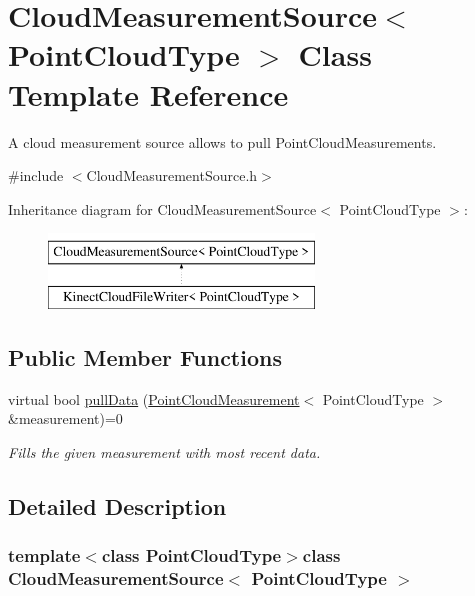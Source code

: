 \hypertarget{class_cloud_measurement_source}{}\section{Cloud\+Measurement\+Source$<$ Point\+Cloud\+Type $>$ Class Template Reference}
\label{class_cloud_measurement_source}


A cloud measurement source allows to pull Point\+Cloud\+Measurements.  




{\ttfamily \#include $<$Cloud\+Measurement\+Source.\+h$>$}

Inheritance diagram for Cloud\+Measurement\+Source$<$ Point\+Cloud\+Type $>$\+:\begin{figure}[H]
\begin{center}
\leavevmode
\includegraphics[height=2.000000cm]{class_cloud_measurement_source}
\end{center}
\end{figure}
\subsection*{Public Member Functions}
\begin{DoxyCompactItemize}
\item 
virtual bool \hyperlink{class_cloud_measurement_source_a99c6819cec1c9e408107c140cccf8918}{pull\+Data} (\hyperlink{class_point_cloud_measurement}{Point\+Cloud\+Measurement}$<$ Point\+Cloud\+Type $>$ \&measurement)=0
\begin{DoxyCompactList}\small\item\em Fills the given measurement with most recent data. \end{DoxyCompactList}\end{DoxyCompactItemize}


\subsection{Detailed Description}
\subsubsection*{template$<$class Point\+Cloud\+Type$>$class Cloud\+Measurement\+Source$<$ Point\+Cloud\+Type $>$}

